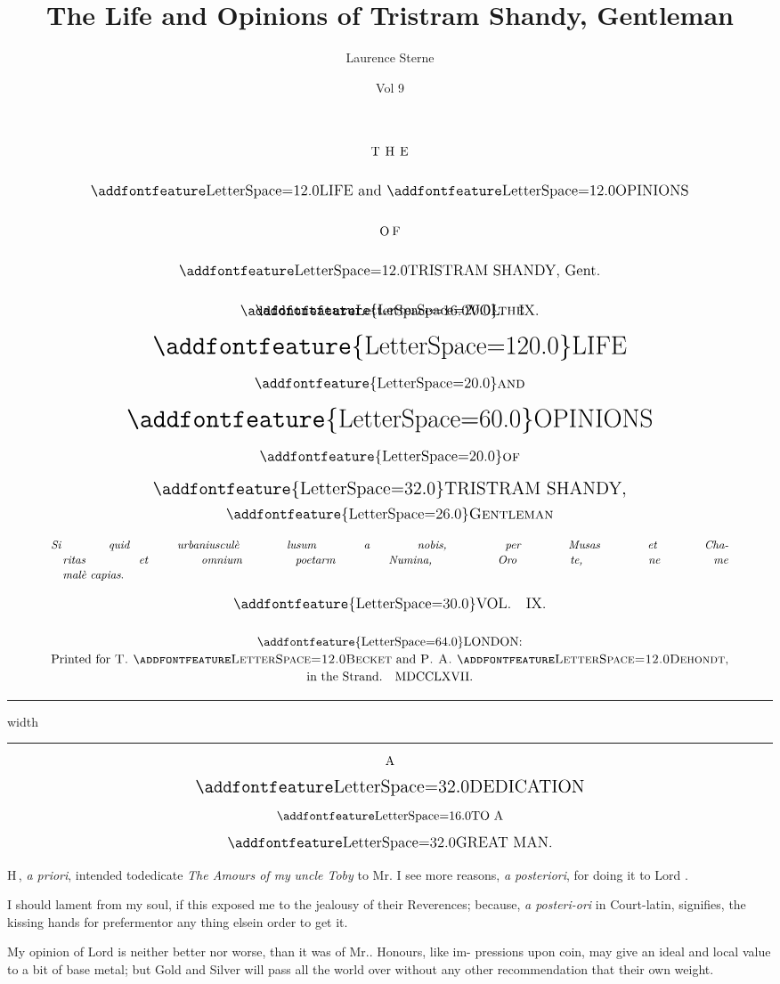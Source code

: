 \documentclass{article}
\title{The Life and Opinions of Tristram Shandy, Gentleman}
\author{Laurence Sterne}
\date{Vol 9}
\begin{document}
\pagestyle{empty}
\null
\vfill
$$\vbox{\openup 20pt\halign{\hss #\hss\cr
\hbox to 3em{T H E}\cr
\large \ls{LIFE} and \ls{OPINIONS}\cr
\hbox to 1.6em{O F}\cr
\large \ls{TRISTRAM SHANDY}, Gent.\cr
\large \lss{VOL}.\quad IX.\cr
}}$$
\vfill
\newpage
\null
\newpage %
\enlargethispage{72pt}
\[\vbox{\openup 12pt\halign{#\cr
\noalign{\vskip -20pt}
\hss\large{\addfontfeature{LetterSpace=20.0}\textsc{the}}\hss\cr
\hss\huge{\addfontfeature{LetterSpace=120.0}LIFE}\hss\cr
\hss\large{\addfontfeature{LetterSpace=20.0}\textsc{and}}\hss\cr
\hss\huge{\addfontfeature{LetterSpace=60.0}OPINIONS}\hss\cr
\hss\large{\addfontfeature{LetterSpace=20.0}\textsc{of}}\hss\cr
\hss\Large{\addfontfeature{LetterSpace=32.0}TRISTRAM SHANDY},\hss\cr
\noalign{\vskip -6pt}
\hss\large{\addfontfeature{LetterSpace=26.0}\textsc{Gentleman}}\hss\cr
\small\textit{Si quid urbaniusculè lusum a nobis, per Musas et Cha-}\cr
\noalign{\vskip -12pt}
\small\textit{\quad ritas et omnium poetarm Numina, Oro te, ne me}\cr
\noalign{\vskip -12pt}
\small\textit{\quad malè capias}.\hfill\cr
\hss\large{\addfontfeature{LetterSpace=30.0}VOL}.\quad IX.\hss\cr
\noalign{\vskip 6pt}
\hss{\addfontfeature{LetterSpace=64.0}LONDON}:\hss\cr
\noalign{\vskip -10pt}
\hss Printed for \textsc{T.\@ \ls{Becket}} and \textsc{P.\@ A.\@ \ls{Dehondt}},\hss\cr
\noalign{\vskip -10pt}
\hss in the Strand.\quad MDCCLXVII.\hss\cr
}}\]
\newpage
\null
\newpage
\pagestyle{dedication}
\thispagestyle{empty}
\setlength{\baselineskip}{14pt}
\hrule height 1pt width \textwidth
\vskip 2pt
\hrule
$$\vbox{\openup 10pt\halign{\hss #\hss\cr
A\cr
\Large \lsss{DEDICATION}\cr
\lss{TO A}\cr
\large\lsss{GREAT MAN}.\cr
}}$$

\bgroup\fontsize{11}{15}\selectfont
\lettrine{H}{\,}, \textit{a priori}, intended
to\break dedicate \textit{The Amours of my}
\textit{uncle Toby} to Mr.\@ {} \tsh I see
more reasons, \textit{a posteriori}, for doing
it to Lord .

I should lament from my soul, if
this exposed me to the jealousy of
their Reverences; because, \textit{a posteri-\pb ori}
in Court-latin, signifies, the\break
kissing hands for preferment\tsk or\break
any thing else\tsk in order to get it.

My opinion of Lord  is\break
neither better nor worse, than it was
of Mr.\@ {}.  Honours, like im-\break
pressions upon coin, may give an\break
ideal and local value to a bit of base
metal; but Gold and Silver will pass
all the world over without any\break 
other recommendation that their\break 
own weight.
\end{document}
